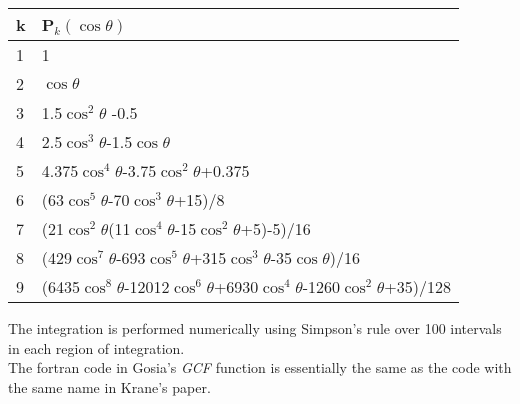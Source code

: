 \begin{center}
\begin{tabular}{|ll|}
\hline
k & P$_k(\cos\theta)$\\
\hline
1 & 1\\
2 & $\cos\theta$\\
3 & 1.5$\cos^2\theta$ -0.5\\
4 & 2.5$\cos^3\theta$-1.5$\cos\theta$\\
5 & 4.375$\cos^4\theta$-3.75$\cos^2\theta$+0.375\\
6 & (63$\cos^5\theta$-70$\cos^3\theta$+15)/8\\
7 & (21$\cos^2\theta$(11$\cos^4\theta$-15$\cos^2\theta$+5)-5)/16\\
8 & (429$\cos^7\theta$-693$\cos^5\theta$+315$\cos^3\theta$-35$\cos\theta$)/16\\
9 & (6435$\cos^8\theta$-12012$\cos^6\theta$+6930$\cos^4\theta$-1260$\cos^2\theta$+35)/128\\
\hline
\end{tabular}
\end{center}

\noindent The integration is performed numerically using Simpson's rule over
100 intervals in each region of integration.\\

\noindent The fortran code in Gosia's {\em GCF} function is essentially the
same as the code with the same name in Krane's paper.\\
